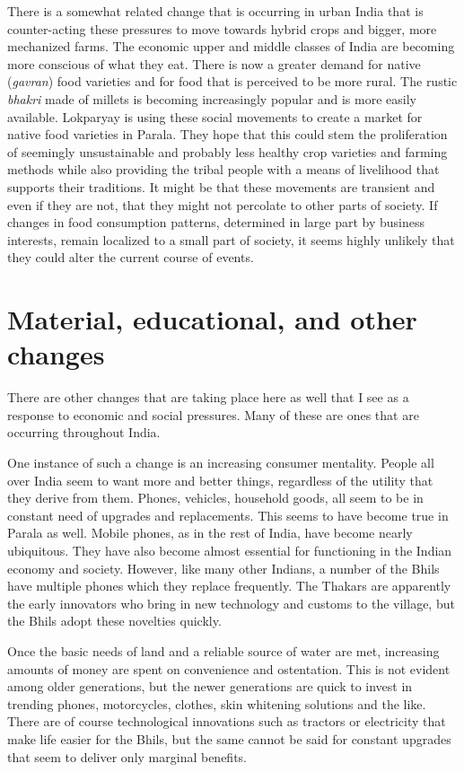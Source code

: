 \documentclass[report.tex]{subfiles}
\begin{document}
There is a somewhat related change that is occurring in urban India that is counter-acting these pressures to move towards hybrid crops and bigger, more mechanized farms. The economic upper and middle classes of India are becoming more conscious of what they eat. There is now a greater demand for native (\textit{gavran}) food varieties and for food that is perceived to be more rural. The rustic \textit{bhakri} made of millets is becoming increasingly popular and is more easily available. Lokparyay is using these social movements to create a market for native food varieties in Parala. They hope that this could stem the proliferation of seemingly unsustainable and probably less healthy crop varieties and farming methods while also providing the tribal people with a means of livelihood that supports their traditions. It might be that these movements are transient and even if they are not, that they might not percolate to other parts of society. If changes in food consumption patterns, determined in large part by business interests, remain localized to a small part of society, it seems highly unlikely that they could alter the current course of events.

\newpage

\section{Material, educational, and other changes}\label{sec:otherchanges}

There are other changes that are taking place here as well that I see as a response to economic and social pressures. Many of these are ones that are occurring throughout India.

One instance of such a change is an increasing consumer mentality. People all over India seem to want more and better things, regardless of the utility that they derive from them. Phones, vehicles, household goods, all seem to be in constant need of upgrades and replacements. This seems to have become true in Parala as well. Mobile phones, as in the rest of India, have become nearly ubiquitous. They have also become almost essential for functioning in the Indian economy and society. However, like many other Indians, a number of the Bhils have multiple phones which they replace frequently. The Thakars are apparently the early innovators who bring in new technology and customs to the village, but the Bhils adopt these novelties quickly.

Once the basic needs of land and a reliable source of water are met, increasing amounts of money are spent on convenience and ostentation. This is not evident among older generations, but the newer generations are quick to invest in trending phones, motorcycles, clothes, skin whitening solutions and the like. There are of course technological innovations such as tractors or electricity that make life easier for the Bhils, but the same cannot be said for constant upgrades that seem to deliver only marginal benefits.
\end{document}
